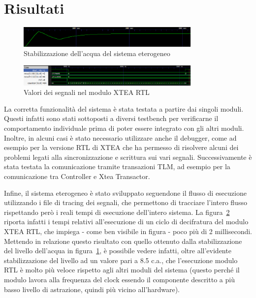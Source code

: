 \documentclass[]{IEEEtran}
\begin{document}
\section{Risultati}

\begin{figure}[tb!]
	\centering
	\includegraphics[width=0.8\textwidth]{figures/water_level_heterogeneous.png}
	\caption{Stabilizzazione dell'acqua del sistema eterogeneo}
	\label{fig:water_heterogeneous}
\end{figure}
\begin{figure}[tb!]
	\centering
	\includegraphics[width=0.8\textwidth]{figures/rtl_signals.png}
	\caption{Valori dei segnali nel modulo XTEA RTL}
	\label{fig:rtl_sig}
\end{figure}

La corretta funzionalit\`a del sistema \`e stata testata a partire dai singoli moduli. Questi infatti sono stati 
sottoposti a diversi testbench per verificarne il comportamento individuale prima di poter essere integrato con gli altri
moduli. Inoltre, in alcuni casi \`e stato necessario utilizzare anche il debugger, come ad esempio per la versione RTL di 
XTEA che ha permesso di risolvere alcuni dei problemi legati alla sincronizzazione e scrittura sui vari segnali.
Successivamente \`e stata testata la comunicazione tramite transazioni TLM, ad esempio per la comunicazione tra
Controller e Xtea Transactor. 

Infine, il sistema eterogeneo è stato sviluppato seguendone il flusso di esecuzione utilizzando i file di tracing dei 
segnali, che permettono di tracciare l'intero flusso rispettando per\`o i reali tempi di esecuzione dell'intero sistema.
La figura~\ref{fig:rtl_sig} riporta infatti i tempi relativi all'esecuzione di un ciclo di decifratura del modulo XTEA RTL,
che impiega - come ben visibile in figura - poco pi\`u di 2 millisecondi.
Mettendo in relazione questo risultato con quello ottenuto dalla stabilizzazione del livello dell'acqua in 
figura~\ref{fig:water_heterogeneous}, \`e possibile vedere infatti, oltre all'evidente stabilizzazione del livello ad un
valore pari a 8.5 c.a., che l'esecuzione modulo RTL \`e molto pi\`u veloce rispetto agli altri moduli del sistema (questo
perché il modulo lavora alla frequenza del clock essendo il componente descritto a pi\`u basso livello di astrazione,
quindi pi\`u vicino all'hardware).
\end{document}
